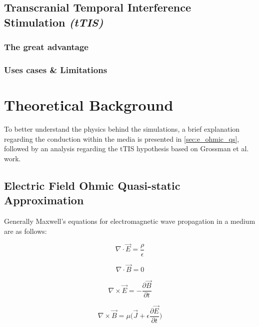 \subsection{Transcranial Temporal Interference Stimulation \textit{(tTIS)}}



\subsubsection{The great advantage}
\subsubsection{Uses cases \& Limitations}


\section{Theoretical Background}

To better understand the physics behind the simulations, a brief explanation regarding the conduction within the media is presented in \autoref{sec:e_ohmic_qs}, followed by an analysis regarding the \gls{tTIS} hypothesis based on Grossman et al.\cite{Grossman2017} work.

\subsection{Electric Field Ohmic Quasi-static Approximation}
\label{sec:e_ohmic_qs}

Generally Maxwell's equations for electromagnetic wave propagation in a medium are as follows:
\begin{center}
\begin{minipage}{.35\linewidth}
    \begin{equation}
        \nabla\cdot\vec{E}=\dfrac{\rho}{\epsilon}
    \end{equation}
\end{minipage}
\begin{minipage}{.35\linewidth}
    \begin{equation}
        \nabla\cdot\vec{B} = 0
    \end{equation}
\end{minipage}\break
\begin{minipage}{.35\linewidth}
    \begin{equation}
        \label{eq:maxwell_curl_e}
        \nabla\times\vec{E}=-\dfrac{\partial\vec{B}}{\partial t}
    \end{equation}
\end{minipage}
\begin{minipage}{.35\linewidth}
    \begin{equation}
        \nabla\times\vec{B} = \mu\Bigg(\vec{J} + \epsilon\dfrac{\partial\vec{E}}{\partial t}\Bigg)
    \end{equation}
\end{minipage}
\end{center}

